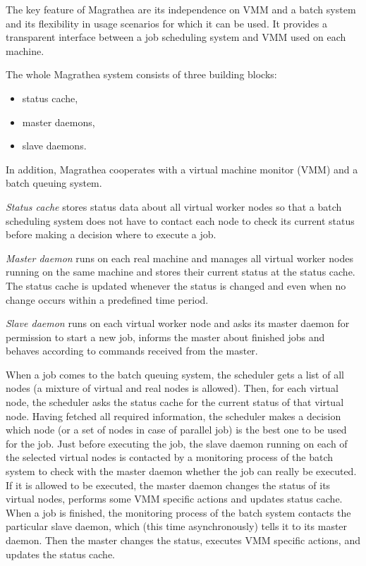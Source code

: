 \documentclass[times,10pt,twocolumn]{article}
\begin{document}
\label{sec:magrathea}

The key feature of Magrathea are its independence on VMM and a batch system and
its flexibility in usage scenarios for which it can be used. It provides a
transparent interface between a job scheduling system and VMM used on each
machine.


The whole Magrathea system consists of three building blocks:
\begin{itemize}
\item status cache,
\item master daemons,
\item slave daemons.
\end{itemize}

In addition, Magrathea cooperates with a virtual machine monitor (VMM) and
a batch queuing system.

\textit{Status cache} stores status data about all virtual worker nodes so
that a batch scheduling system does not have to contact each node to check its
current status before making a decision where to execute a job.

\textit{Master daemon} runs on each real machine and manages all virtual
worker nodes running on the same machine and stores their current status at
the status cache. The status cache is updated whenever the status is changed
and even when no change occurs within a predefined time period.

\textit{Slave daemon} runs on each virtual worker node and asks its master
daemon for permission to start a new job, informs the master about finished
jobs and behaves according to commands received from the master.

When a job comes to the batch queuing system, the scheduler gets a list of all
nodes (a mixture of virtual and real nodes is allowed). Then, for each virtual
node, the scheduler asks the status cache for the current status of that
virtual node. Having fetched all required information, the scheduler makes a
decision which node (or a set of nodes in case of parallel job) is the best
one to be used for the job. Just before executing the job, the slave daemon
running on each of the selected virtual nodes is contacted by a monitoring
process of the batch system to check with the master daemon whether the job
can really be executed. If it is allowed to be executed, the master daemon
changes the status of its virtual nodes, performs some VMM specific actions
and updates status cache. When a job is finished, the monitoring process of
the batch system contacts the particular slave daemon, which (this time
asynchronously) tells it to its master daemon. Then the master changes the
status, executes VMM specific actions, and updates the status cache.
\end{document}

